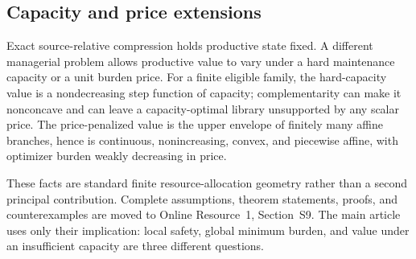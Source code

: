 \subsection{Capacity and price extensions}

Exact source-relative compression holds productive state fixed. A different
managerial problem allows productive value to vary under a hard maintenance
capacity or a unit burden price. For a finite eligible family, the hard-capacity
value is a nondecreasing step function of capacity; complementarity can make it
nonconcave and can leave a capacity-optimal library unsupported by any scalar
price. The price-penalized value is the upper envelope of finitely many affine
branches, hence is continuous, nonincreasing, convex, and piecewise affine, with
optimizer burden weakly decreasing in price.

These facts are standard finite resource-allocation geometry rather than a
second principal contribution. Complete assumptions, theorem statements,
proofs, and counterexamples are moved to Online Resource~1, Section~S9. The
main article uses only their implication: local
safety, global minimum burden, and value under an insufficient capacity are
three different questions.
